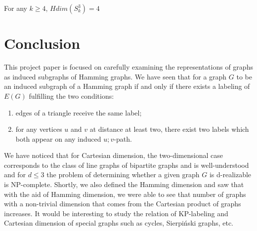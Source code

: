 \documentclass[12pt,a4paper,titlepage,openany]{report}
\begin{document}
\begin{corollary}
For any $k\geq 4$, $Hdim(S_k^3)=4$
\end{corollary}

\chapter{Conclusion}
This project paper is focused on carefully examining the representations of graphs as induced subgraphs of Hamming graphs. We have seen that for a graph $G$ to be an induced subgraph of a Hamming graph if and only if there exists a labeling of $E(G)$ fulfilling the two conditions:\begin{enumerate}
\item edges of a triangle receive the same label;
\item for any vertices $u$ and $v$ at distance at least two, there exist two labels which both appear on any induced $u; v$-path. 
\end{enumerate}
We have noticed that for Cartesian dimension, the two-dimensional case corresponds to the class of line graphs of bipartite graphs and is well-understood and for $d\leq 3$ the problem of determining whether a given graph $G$ is d-realizable is NP-complete.\newline
Shortly, we also defined the Hamming dimension and saw that with the aid of Hamming dimension, we were able to see  that number of graphs with a non-trivial dimension that comes from the Cartesian product of graphs increases.\newline
It would be interesting to study the relation of KP-labeling and Cartesian dimension of special graphs such as cycles, Sierpi\'nski graphs, etc. 
\end{document}
